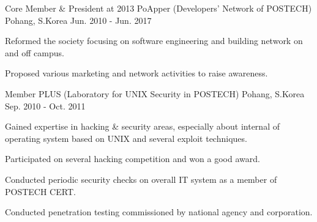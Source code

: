 

\begin{cventries}

  \cventry
    {Core Member \& President at 2013} %
    {PoApper (Developers' Network of POSTECH)} %
    {Pohang, S.Korea} %
    {Jun. 2010 - Jun. 2017} %
    {
      \begin{cvitems} %
        \item {Reformed the society focusing on software engineering and building network on and off campus.}
        \item {Proposed various marketing and network activities to raise awareness.}
      \end{cvitems}
    }

\entryskip
  \cventry
    {Member} %
    {PLUS (Laboratory for UNIX Security in POSTECH)} %
    {Pohang, S.Korea} %
    {Sep. 2010 - Oct. 2011} %
    {
      \begin{cvitems} %
        \item {Gained expertise in hacking \& security areas, especially about internal of operating system based on UNIX and several exploit techniques.}
        \item {Participated on several hacking competition and won a good award.}
        \item {Conducted periodic security checks on overall IT system as a member of POSTECH CERT.}
        \item {Conducted penetration testing commissioned by national agency and corporation.}
      \end{cvitems}
    }

\end{cventries}
